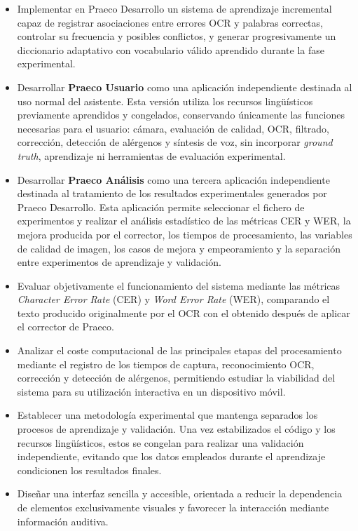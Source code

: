 \begin{itemize}
	\item Implementar en Praeco Desarrollo un sistema de aprendizaje incremental capaz de registrar asociaciones entre errores OCR y palabras correctas, controlar su frecuencia y posibles conflictos, y generar progresivamente un diccionario adaptativo con vocabulario válido aprendido durante la fase experimental.
	
	\item Desarrollar \textbf{Praeco Usuario} como una aplicación independiente destinada al uso normal del asistente. Esta versión utiliza los recursos lingüísticos previamente aprendidos y congelados, conservando únicamente las funciones necesarias para el usuario: cámara, evaluación de calidad, OCR, filtrado, corrección, detección de alérgenos y síntesis de voz, sin incorporar \textit{ground truth}, aprendizaje ni herramientas de evaluación experimental.
	
	\item Desarrollar \textbf{Praeco Análisis} como una tercera aplicación independiente destinada al tratamiento de los resultados experimentales generados por Praeco Desarrollo. Esta aplicación permite seleccionar el fichero de experimentos y realizar el análisis estadístico de las métricas CER y WER, la mejora producida por el corrector, los tiempos de procesamiento, las variables de calidad de imagen, los casos de mejora y empeoramiento y la separación entre experimentos de aprendizaje y validación.
	
	\item Evaluar objetivamente el funcionamiento del sistema mediante las métricas \textit{Character Error Rate} (CER) y \textit{Word Error Rate} (WER), comparando el texto producido originalmente por el OCR con el obtenido después de aplicar el corrector de Praeco.
	
	\item Analizar el coste computacional de las principales etapas del procesamiento mediante el registro de los tiempos de captura, reconocimiento OCR, corrección y detección de alérgenos, permitiendo estudiar la viabilidad del sistema para su utilización interactiva en un dispositivo móvil.
	
	\item Establecer una metodología experimental que mantenga separados los procesos de aprendizaje y validación. Una vez estabilizados el código y los recursos lingüísticos, estos se congelan para realizar una validación independiente, evitando que los datos empleados durante el aprendizaje condicionen los resultados finales.
	
	\item Diseñar una interfaz sencilla y accesible, orientada a reducir la dependencia de elementos exclusivamente visuales y favorecer la interacción mediante información auditiva.
	
\end{itemize}

